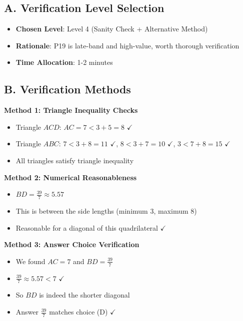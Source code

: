 \documentclass[11pt]{article}
\begin{document}
\begin{verificationbox}
\subsection*{A. Verification Level Selection}
\begin{itemize}[leftmargin=*]
    \item \textbf{Chosen Level}: Level 4 (Sanity Check + Alternative Method)
    \item \textbf{Rationale}: P19 is late-band and high-value, worth thorough verification
    \item \textbf{Time Allocation}: 1-2 minutes
\end{itemize}

\subsection*{B. Verification Methods}

\textbf{Method 1: Triangle Inequality Checks}
\begin{itemize}
    \item Triangle $ACD$: $AC = 7 < 3 + 5 = 8$ $\checkmark$
    \item Triangle $ABC$: $7 < 3 + 8 = 11$ $\checkmark$, $8 < 3 + 7 = 10$ $\checkmark$, $3 < 7 + 8 = 15$ $\checkmark$
    \item All triangles satisfy triangle inequality
\end{itemize}

\textbf{Method 2: Numerical Reasonableness}
\begin{itemize}
    \item $BD = \frac{39}{7} \approx 5.57$
    \item This is between the side lengths (minimum 3, maximum 8)
    \item Reasonable for a diagonal of this quadrilateral $\checkmark$
\end{itemize}

\textbf{Method 3: Answer Choice Verification}
\begin{itemize}
    \item We found $AC = 7$ and $BD = \frac{39}{7}$
    \item $\frac{39}{7} \approx 5.57 < 7$ $\checkmark$
    \item So $BD$ is indeed the shorter diagonal
    \item Answer $\frac{39}{7}$ matches choice (D) $\checkmark$
\end{itemize}


\end{verificationbox}
\end{document}
